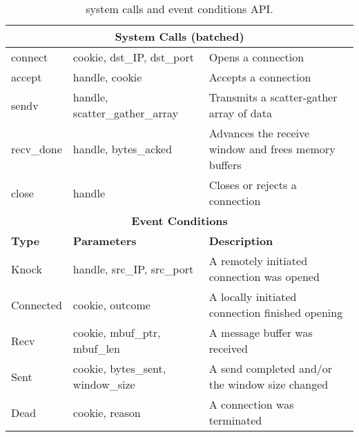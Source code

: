 \begin{table*}[t]
\centering
\begin{small}
\begin{tabular}{|l|l|l|}
\hline
\multicolumn{3}{|c|}{{\bf System Calls (batched)}} \\
\hline
connect &             cookie, dst\_IP, dst\_port		& Opens a connection\\
accept &              handle, cookie				& Accepts a connection\\
sendv &               handle, scatter\_gather\_array		& Transmits a scatter-gather array of data\\
recv\_done &          handle, bytes\_acked			& Advances the receive window and frees memory buffers\\
close &               handle					& Closes or rejects a connection\\
\hline  \hline
\multicolumn{3}{|c|}{{\bf Event Conditions}} \\
\hline
{\bf Type} &           {\bf Parameters}  &
{\bf Description}\\
Knock  &               handle, src\_IP, src\_port		& A remotely initiated connection was opened \\
Connected &            cookie, outcome				& A locally initiated connection finished opening \\
Recv &                 cookie, mbuf\_ptr, mbuf\_len		& A message buffer was received \\
Sent &                 cookie, bytes\_sent, window\_size	& A send completed and/or the window size changed \\
Dead &                 cookie, reason				& A connection was terminated \\
\hline
\end{tabular}
\caption{\ix system calls and event conditions API. 
}
\label{tbl:api}
\end{small}
\end{table*}

